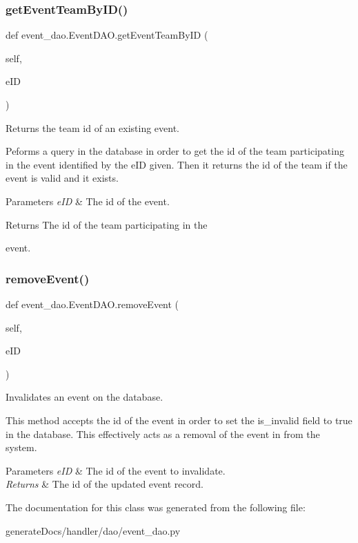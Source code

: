 \subsubsection{\texorpdfstring{get\+Event\+Team\+By\+I\+D()}{getEventTeamByID()}}
{\footnotesize\ttfamily def event\+\_\+dao.\+Event\+D\+A\+O.\+get\+Event\+Team\+By\+ID (\begin{DoxyParamCaption}\item[{}]{self,  }\item[{}]{e\+ID }\end{DoxyParamCaption})}



Returns the team id of an existing event. 

Peforms a query in the database in order to get the id of the team participating in the event identified by the e\+ID given. Then it returns the id of the team if the event is valid and it exists.


\begin{DoxyParams}{Parameters}
{\em e\+ID} & The id of the event. \\
\hline
\end{DoxyParams}
\begin{DoxyReturn}{Returns}
The id of the team participating in the 

event. 
\end{DoxyReturn}
\mbox{\label{classevent__dao_1_1_event_d_a_o_ab7216495895bc8675151462570a5f6e4}} 
\subsubsection{\texorpdfstring{remove\+Event()}{removeEvent()}}
{\footnotesize\ttfamily def event\+\_\+dao.\+Event\+D\+A\+O.\+remove\+Event (\begin{DoxyParamCaption}\item[{}]{self,  }\item[{}]{e\+ID }\end{DoxyParamCaption})}



Invalidates an event on the database. 

This method accepts the id of the event in order to set the is\+\_\+invalid field to true in the database. This effectively acts as a removal of the event in from the system.


\begin{DoxyParams}{Parameters}
{\em e\+ID} & The id of the event to invalidate. \\
\hline
{\em Returns} & The id of the updated event record. \\
\hline
\end{DoxyParams}


The documentation for this class was generated from the following file\+:\begin{DoxyCompactItemize}
\item 
generate\+Docs/handler/dao/event\+\_\+dao.\+py\end{DoxyCompactItemize}
